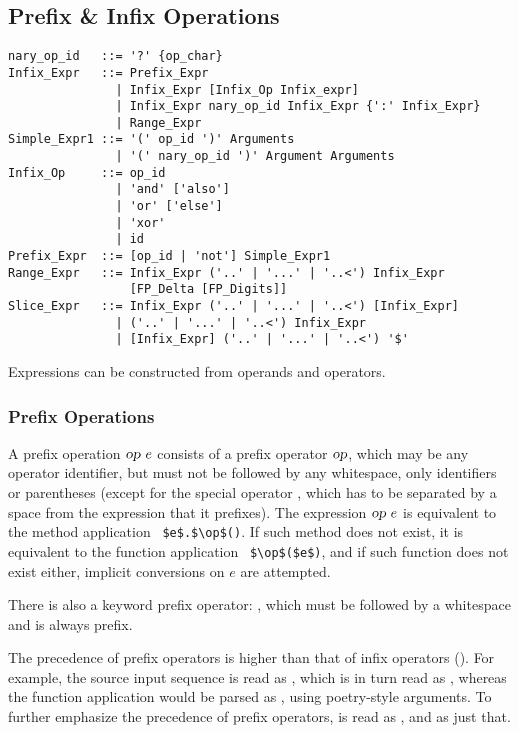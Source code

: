 \subsection{Prefix \& Infix Operations}
\label{sec:prefix-infix-ops}

\syntax\begin{lstlisting}[mathescape=false]
nary_op_id   ::= '?' {op_char}
Infix_Expr   ::= Prefix_Expr
               | Infix_Expr [Infix_Op Infix_expr]
               | Infix_Expr nary_op_id Infix_Expr {':' Infix_Expr}
               | Range_Expr
Simple_Expr1 ::= '(' op_id ')' Arguments
               | '(' nary_op_id ')' Argument Arguments
Infix_Op     ::= op_id 
               | 'and' ['also']
               | 'or' ['else']
               | 'xor'
               | id
Prefix_Expr  ::= [op_id | 'not'] Simple_Expr1
Range_Expr   ::= Infix_Expr ('..' | '...' | '..<') Infix_Expr
                 [FP_Delta [FP_Digits]]
Slice_Expr   ::= Infix_Expr ('..' | '...' | '..<') [Infix_Expr]
               | ('..' | '...' | '..<') Infix_Expr
               | [Infix_Expr] ('..' | '...' | '..<') '$'
\end{lstlisting}

Expressions can be constructed from operands and operators. 





\subsubsection{Prefix Operations}

A prefix operation $\mbox{\sl op}\ e$ consists of a prefix operator $\mbox{\sl op}$, which may be any operator identifier, but must not be followed by any whitespace, only identifiers or parentheses (except for the special operator , which has to be separated by a space from the expression that it prefixes). The expression $\mbox{\sl op}\ e$ is equivalent to the method application ~\lstinline!$e$.$\op$()!. If such method does not exist, it is equivalent to the function application ~\lstinline!$\op$($e$)!, and if such function does not exist either, implicit conversions on $e$ are attempted. 

There is also a keyword prefix operator: , which must be followed by a whitespace and is always prefix.

The precedence of prefix operators is higher than that of infix operators (). For example, the source input sequence  is read as , which is in turn read as , whereas the function application  would be parsed as , using poetry-style arguments. To further emphasize the precedence of prefix operators,  is read as , and  as just that. 


